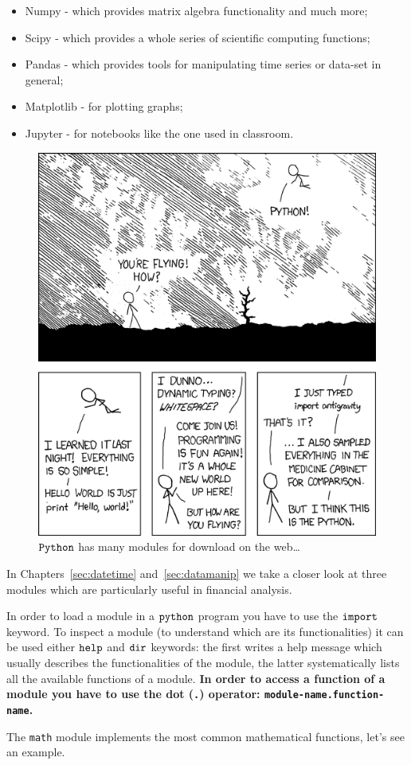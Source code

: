 \begin{itemize}
\tightlist
\item
  Numpy - which provides matrix algebra functionality and much more;
\item
  Scipy - which provides a whole series of scientific computing
  functions;
\item
  Pandas - which provides tools for manipulating time series or data-set
  in general;
\item
  Matplotlib - for plotting graphs;
\item
  Jupyter - for notebooks like the one used in classroom.
\end{itemize}

\begin{figure}
\centering
\includegraphics[width=0.5\linewidth]{figures/python.png}
\caption{$\tt{Python}$ has many modules for download on the web\ldots{}}
\label{fig:fancy_module}
\end{figure}

In Chapters~\ref{sec:datetime} and~\ref{sec:datamanip} we take a closer look at three modules which are particularly 
useful in financial analysis.

In order to load a module in a \(\tt{python}\) program you have to use the \(\tt{import}\) keyword. 
To inspect a module (to understand which are its functionalities) it can be used either 
\(\tt{help}\) and \(\tt{dir}\) keywords: the first writes a help message which usually describes 
the functionalities of the module, the latter systematically lists all the available functions of a module.
\textbf{In order to access a function of a module you have to use the dot (\texttt{.}) operator: 
\texttt{module-name.function-name}.}

The \texttt{math} module implements the most common mathematical functions, let's see an example. 

